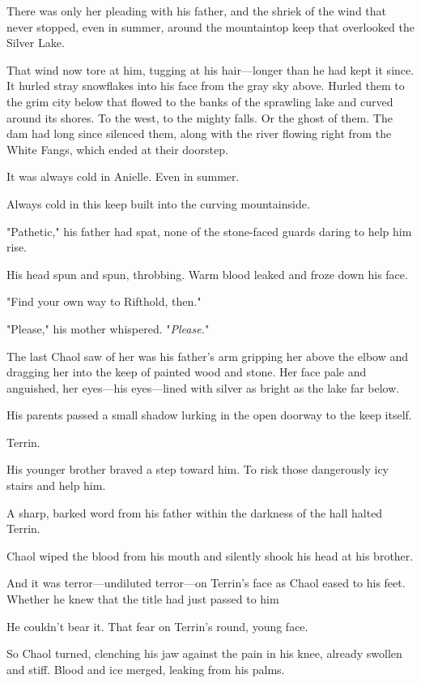 There was only her pleading with his father, and the shriek of the wind that never stopped, even in summer, around the mountaintop keep that overlooked the Silver Lake.

That wind now tore at him, tugging at his hair---longer than he had kept it since. It hurled stray snowflakes into his face from the gray sky above. Hurled them to the grim city below that flowed to the banks of the sprawling lake and curved around its shores. To the west, to the mighty falls. Or the ghost of them. The dam had long since silenced them, along with the river flowing right from the White Fangs, which ended at their doorstep.

It was always cold in Anielle. Even in summer.

Always cold in this keep built into the curving mountainside.

"Pathetic," his father had spat, none of the stone-faced guards daring to help him rise.

His head spun and spun, throbbing. Warm blood leaked and froze down his face.

"Find your own way to Rifthold, then."

"Please," his mother whispered. "\emph{Please.}"

The last Chaol saw of her was his father's arm gripping her above the elbow and dragging her into the keep of painted wood and stone. Her face pale and anguished, her eyes---his eyes---lined with silver as bright as the lake far below.

His parents passed a small shadow lurking in the open doorway to the keep itself.

Terrin.

His younger brother braved a step toward him. To risk those dangerously icy stairs and help him.

A sharp, barked word from his father within the darkness of the hall halted Terrin.

Chaol wiped the blood from his mouth and silently shook his head at his brother.

And it was terror---undiluted terror---on Terrin's face as Chaol eased to his feet. Whether he knew that the title had just passed to him


He couldn't bear it. That fear on Terrin's round, young face.

So Chaol turned, clenching his jaw against the pain in his knee, already swollen and stiff. Blood and ice merged, leaking from his palms.


